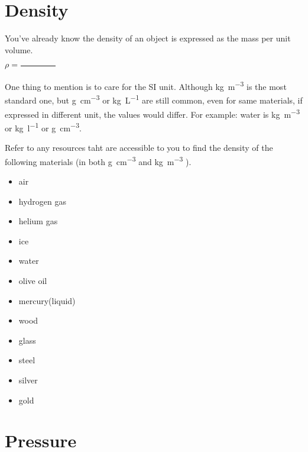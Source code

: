 \documentclass[a4paper]{tufte-handout}
\newenvironment{TaskBox} %
{\begin{tcolorbox}[breakable,colback=b1!30,colframe=b1,title=Task]} {\end{tcolorbox}}
\newenvironment{SummBox}
{\begin{tcolorbox}[breakable,colback=r1!30,colframe=r1,title=Summary]} {\end{tcolorbox}}
\begin{document}
\section{Density}
You've already know the density of an object is expressed as the mass per unit volume. 
\begin{SummBox}
\begin{center} 
$\rho = \frac{}{\hspace{1in}}$
\end{center}
\end{SummBox}
One thing to mention is to care for the SI unit. Although \si{kg.m^{-3}} is the most standard one, but \si{g.cm^{-3}} or \si{kg.L^{-1}} are still common, even for same materials, if expressed in different unit, the values would differ. For example: water is \uline{\hspace{1in}} \si{kg.m^{-3}} or \uline{\hspace{1in}} \si{\kg\per\litre} or \uline{\hspace{1in}}\si{\gram\per\cubic\centi\metre}.

\begin{TaskBox}
Refer to any resources taht are accessible to you to find the density of the following materials (in both \si{g.cm^{-3}} and \si{kg.m^{-3}} ).
\begin{itemize}
  \item air
  \item hydrogen gas
  \item helium gas
  \item ice
  \item water
  \item olive oil
  \item mercury(liquid)
  \item wood
  \item glass
  \item steel
  \item silver
  \item gold
\end{itemize}
\end{TaskBox}

\section{Pressure}
\end{document}
